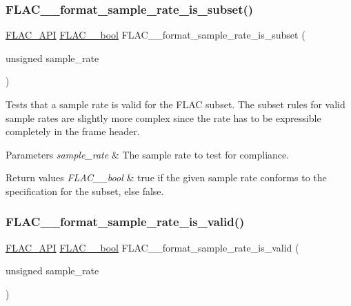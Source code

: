 \subsubsection{\texorpdfstring{FLAC\_\_format\_sample\_rate\_is\_subset()}{FLAC\_\_format\_sample\_rate\_is\_subset()}}
{\footnotesize\ttfamily \mbox{\hyperlink{group__flac__export_ga56ca07df8a23310707732b1c0007d6f5}{F\+L\+A\+C\+\_\+\+A\+PI}} \mbox{\hyperlink{ordinals_8h_a95103469f1cbd78b8cf250194985b34e}{F\+L\+A\+C\+\_\+\+\_\+bool}} F\+L\+A\+C\+\_\+\+\_\+format\+\_\+sample\+\_\+rate\+\_\+is\+\_\+subset (\begin{DoxyParamCaption}\item[{unsigned}]{sample\+\_\+rate }\end{DoxyParamCaption})}

Tests that a sample rate is valid for the F\+L\+AC subset. The subset rules for valid sample rates are slightly more complex since the rate has to be expressible completely in the frame header.


\begin{DoxyParams}{Parameters}
{\em sample\+\_\+rate} & The sample rate to test for compliance. \\
\hline
\end{DoxyParams}

\begin{DoxyRetVals}{Return values}
{\em F\+L\+A\+C\+\_\+\+\_\+bool} & {\ttfamily true} if the given sample rate conforms to the specification for the subset, else {\ttfamily false}. \\
\hline
\end{DoxyRetVals}
\mbox{\label{group__flac__format_gaec1c46afe33c0bb200be68bb36e0dd32}} 
\subsubsection{\texorpdfstring{FLAC\_\_format\_sample\_rate\_is\_valid()}{FLAC\_\_format\_sample\_rate\_is\_valid()}}
{\footnotesize\ttfamily \mbox{\hyperlink{group__flac__export_ga56ca07df8a23310707732b1c0007d6f5}{F\+L\+A\+C\+\_\+\+A\+PI}} \mbox{\hyperlink{ordinals_8h_a95103469f1cbd78b8cf250194985b34e}{F\+L\+A\+C\+\_\+\+\_\+bool}} F\+L\+A\+C\+\_\+\+\_\+format\+\_\+sample\+\_\+rate\+\_\+is\+\_\+valid (\begin{DoxyParamCaption}\item[{unsigned}]{sample\+\_\+rate }\end{DoxyParamCaption})}


